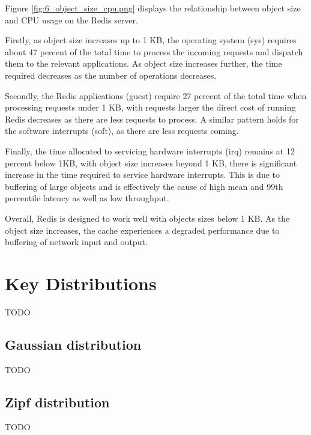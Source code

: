 Figure \ref{fig:6_object_size_cpu.png} displays the relationship between object size and CPU usage on the Redis server.

Firstly, as object size increases up to 1 KB, the operating system (sys) requires about 47 percent of the total time to process the incoming requests and dispatch them to the relevant applications. As object size increases further, the time required decreases as the number of operations decreases.

Secondly, the Redis applications (guest) require 27 percent of the total time when processing requests under 1 KB, with requests larger the direct cost of running Redis decreases as there are less requests to process. A similar pattern holds for the software interrupts (soft), as there are less requests coming.

Finally, the time allocated to servicing hardware interrupts (irq) remains at 12 percent below 1KB, with object size increases beyond 1 KB, there is significant increase in the time required to service hardware interrupts. This is due to buffering of large objects and is effectively the cause of high mean and 99th percentile latency as well as low throughput.


Overall, Redis is designed to work well with objects sizes below 1 KB. As the object size increases, the cache experiences a degraded performance due to buffering of network input and output.

\section{Key Distributions}
TODO

\subsection{Gaussian distribution}
TODO

\subsection{Zipf distribution}
TODO